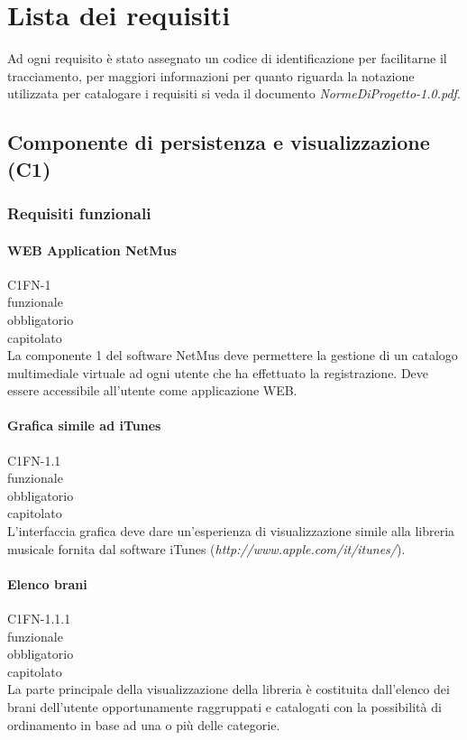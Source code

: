 \chapter{Lista dei requisiti}
\thispagestyle{fancy}
Ad ogni requisito \`e stato assegnato un codice di identificazione per facilitarne
il tracciamento, per maggiori informazioni per quanto riguarda la notazione
utilizzata per catalogare i requisiti si veda il documento
\emph{NormeDiProgetto-1.0.pdf}.

\section{Componente di persistenza e visualizzazione (C1)}
\subsection{Requisiti funzionali}

\subsubsection*{WEB Application NetMus}
 C1FN-1 \\
 funzionale \\
 obbligatorio \\
 capitolato\\
La componente 1 del software NetMus deve permettere la gestione di un catalogo
multimediale virtuale ad ogni utente che ha effettuato la registrazione.
Deve essere accessibile all'utente come applicazione WEB.

\subsubsection*{Grafica simile ad iTunes}
 C1FN-1.1 \\
 funzionale \\
 obbligatorio \\
 capitolato \\
L'interfaccia grafica deve dare un'esperienza di visualizzazione simile alla
libreria musicale fornita dal software iTunes (\emph{http://www.apple.com/it/itunes/}).

\subsubsection*{Elenco brani}
 C1FN-1.1.1 \\
 funzionale \\
 obbligatorio \\
 capitolato \\
La parte principale della visualizzazione della libreria \`e costituita
dall'elenco dei brani dell'utente opportunamente raggruppati e catalogati con la
possibilit\`a di ordinamento in base ad una o pi\`u delle categorie.

